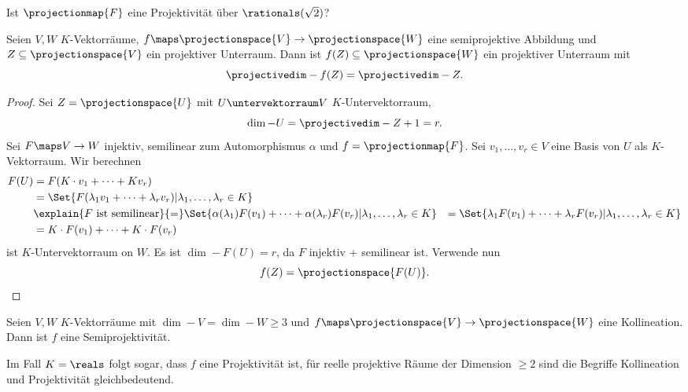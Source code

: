\begin{frage*}
  Ist \( \projectionmap{F} \) eine Projektivität über \( \rationals(\sqrt{2}) \)?
\end{frage*}
\begin{lemma}
  Seien \( V,W \) \( K \)-Vektorräume, \( f\maps \projectionspace{V}\to \projectionspace{W} \) eine semiprojektive Abbildung und \( Z\subseteq \projectionspace{V} \) ein projektiver Unterraum. Dann ist \( f(Z)\subseteq \projectionspace{W} \) ein projektiver Unterraum mit 
  \begin{equation*}
    \projectivedim-{f(Z)}=\projectivedim-{Z}.
  \end{equation*}
\end{lemma}
\begin{proof}
  Sei \( Z=\projectionspace{U} \) mit \( U\untervektorraum V \) \( K \)-Untervektorraum,
  \begin{equation*}
    \dim-{U}=\projectivedim-{Z}+1=r.
  \end{equation*}
  Sei \( F\maps V\to W \) injektiv, semilinear zum Automorphismus \( \alpha \) und \( f=\projectionmap{F} \). Sei \( v_1,\dotsc,v_r\in V \) eine Basis von \( U \) als \( K \)-Vektorraum. Wir berechnen
  \begin{align*}
    F(U)&=F(K\cdot v_1+\dotsb+K v_r)\\
    &=\Set{F(\lambda_1 v_1+\dotsb+\lambda_r v_r)|\lambda_1,\dotsc,\lambda_r\in K}\\
    &\explain{F \text{ ist semilinear}}{=}\Set{\alpha(\lambda_1)F(v_1)+\dotsb+\alpha(\lambda_r)F(v_r)|\lambda_1,\dotsc,\lambda_r\in K}
    &=\Set{\lambda_1 F(v_1)+\dotsb+\lambda_r F(v_r)|\lambda_1,\dotsc,\lambda_r\in K}\\
    &=K\cdot F(v_1)+\dotsb+K\cdot F(v_r)
  \end{align*}
  ist \( K \)-Untervektorraum on \( W \). Es ist \( \dim-{F(U)}=r \), da \( F \) injektiv + semilinear ist. Verwende nun
  \begin{equation*}
    f(Z)=\projectionspace{F(U)}.
  \end{equation*}  
\end{proof}
\begin{satz}\label{hauptsatz_projektive_geometrie}
  Seien \( V,W \) \( K \)-Vektorräume mit \( \dim-{V}=\dim-{W}\geq 3 \) und \( f\maps \projectionspace{V}\to\projectionspace{W} \) eine Kollineation. Dann ist \( f \) eine Semiprojektivität.
\end{satz}
\begin{bemerkung*}
  Im Fall \( K=\reals \) folgt sogar, dass \( f \) eine Projektivität ist, \dh für reelle projektive Räume der Dimension \( \geq 2 \) sind die Begriffe Kollineation und Projektivität gleichbedeutend.
\end{bemerkung*}